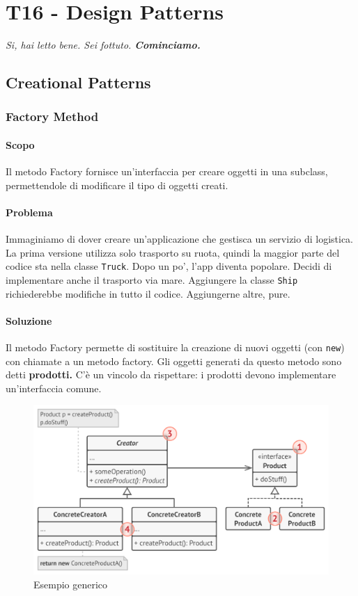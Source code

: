 \documentclass[11pt]{article}
\newcommand{\code}[1]{\texttt{#1}}
\begin{document}
\section{T16 - Design Patterns}
\textit{Si, hai letto bene. Sei fottuto. \textbf{Cominciamo.}}
\subsection{Creational Patterns}
\subsubsection{Factory Method}
\paragraph{Scopo}
Il metodo Factory fornisce un'interfaccia per creare oggetti in una subclass, permettendole di modificare il tipo di oggetti creati.
\paragraph{Problema}
Immaginiamo di dover creare un'applicazione che gestisca un servizio di logistica. La prima versione utilizza solo trasporto su ruota, quindi la maggior parte del codice sta nella classe \code{Truck}. Dopo un po', l'app diventa popolare. Decidi di implementare anche il trasporto via mare. Aggiungere la classe \code{Ship} richiederebbe modifiche in tutto il codice. Aggiungerne altre, pure.
\paragraph{Soluzione}
Il metodo Factory permette di sostituire la creazione di nuovi oggetti (con \code{new}) con chiamate a un metodo factory. Gli oggetti generati da questo metodo sono detti \textbf{prodotti.} C'è un vincolo da rispettare: i prodotti devono implementare un'interfaccia comune.
\begin{figure}[H]
    \centering
    \includegraphics[width=\linewidth]{res/teoria/Factory.png}
    \caption{Esempio generico}
\end{figure}
\end{document}
